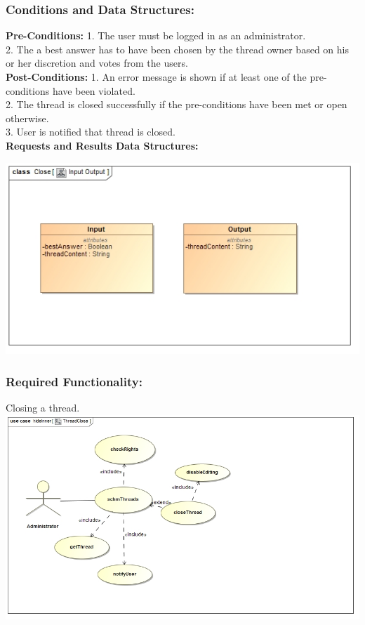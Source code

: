 \documentclass[a4paper,11pt]{article}
\begin{document}
\subsubsection{Conditions and Data Structures:}
\textbf{Pre-Conditions:}
1.	The user must be logged in as an administrator.\\
2.	The a best answer has to have been chosen by the thread owner based on his or her discretion and votes from the users.\\
\textbf{Post-Conditions:}
1.	An error message is shown if at least one of the pre-conditions have been violated.\\
2.	The thread is closed successfully if the pre-conditions have been met or open otherwise.\\
3.	User is notified that thread is closed.\\
\textbf{Requests and Results Data Structures:}
\begin{center}
\includegraphics[width=1\linewidth]{Images/SCHMThread/CloseInOut.jpg}\\
\end{center}
\subsubsection{Required Functionality:} 
Closing a thread.\\
\includegraphics[width=0.7\linewidth]{./Images/SCHMThread/ThreadClose.jpg}\\
\end{document}
